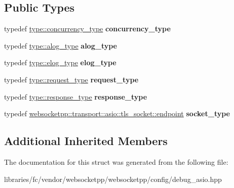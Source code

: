 \subsection*{Public Types}
\begin{DoxyCompactItemize}
\item 
\mbox{\label{structwebsocketpp_1_1config_1_1debug__asio__tls_1_1transport__config_a357e9e1e7c62aee01740a753f2d18698}} 
typedef \mbox{\hyperlink{classwebsocketpp_1_1concurrency_1_1basic}{type\+::concurrency\+\_\+type}} {\bfseries concurrency\+\_\+type}
\item 
\mbox{\label{structwebsocketpp_1_1config_1_1debug__asio__tls_1_1transport__config_aaec929d2b73d58d487614f632bcd4a0b}} 
typedef \mbox{\hyperlink{classwebsocketpp_1_1log_1_1basic}{type\+::alog\+\_\+type}} {\bfseries alog\+\_\+type}
\item 
\mbox{\label{structwebsocketpp_1_1config_1_1debug__asio__tls_1_1transport__config_a82e3a3118bf4252cc72e801e2ff18286}} 
typedef \mbox{\hyperlink{structwebsocketpp_1_1config_1_1debug__core_acfa1ded7f80d6a7276b0ec3fd0859fc3}{type\+::elog\+\_\+type}} {\bfseries elog\+\_\+type}
\item 
\mbox{\label{structwebsocketpp_1_1config_1_1debug__asio__tls_1_1transport__config_af22650baa6f51b2d2ad964d5fc53f0c3}} 
typedef \mbox{\hyperlink{classwebsocketpp_1_1http_1_1parser_1_1request}{type\+::request\+\_\+type}} {\bfseries request\+\_\+type}
\item 
\mbox{\label{structwebsocketpp_1_1config_1_1debug__asio__tls_1_1transport__config_ac70bda525dfbcd7b8e631aa2397bbcfe}} 
typedef \mbox{\hyperlink{classwebsocketpp_1_1http_1_1parser_1_1response}{type\+::response\+\_\+type}} {\bfseries response\+\_\+type}
\item 
\mbox{\label{structwebsocketpp_1_1config_1_1debug__asio__tls_1_1transport__config_a3d3916ddd31f98910ec974518f1c1c90}} 
typedef \mbox{\hyperlink{classwebsocketpp_1_1transport_1_1asio_1_1tls__socket_1_1endpoint}{websocketpp\+::transport\+::asio\+::tls\+\_\+socket\+::endpoint}} {\bfseries socket\+\_\+type}
\end{DoxyCompactItemize}
\subsection*{Additional Inherited Members}


The documentation for this struct was generated from the following file\+:\begin{DoxyCompactItemize}
\item 
libraries/fc/vendor/websocketpp/websocketpp/config/debug\+\_\+asio.\+hpp\end{DoxyCompactItemize}
